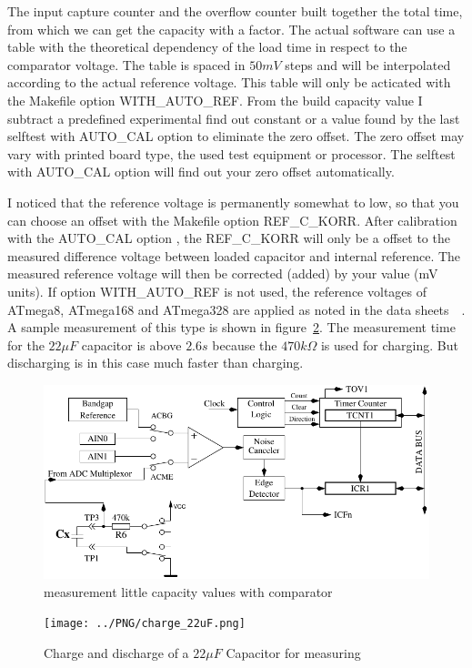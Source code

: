 The input capture counter and the overflow counter built together the total time,
from which we can get the capacity with a factor.
The actual software can use a table with the theoretical  dependency of the load time in respect to the comparator voltage.
The table is spaced in \(50mV\) steps and will be interpolated according to the actual reference voltage. 
This table will only be acticated with the Makefile option WITH\_AUTO\_REF.
From the build capacity value I subtract a predefined experimental find out constant or a value found by the last selftest
with AUTO\_CAL option to eliminate the zero offset. 
The zero offset may vary with printed board type, the used test equipment or processor.
The selftest with AUTO\_CAL option will find out your zero offset automatically.

I noticed that the reference voltage is permanently somewhat to low,
 so that you can choose an offset with the Makefile option REF\_C\_KORR.
After calibration with the AUTO\_CAL option , the REF\_C\_KORR will only be a offset to the measured difference voltage
between loaded capacitor and internal reference.
The measured reference voltage will then be corrected (added) by your value (mV units).
If option WITH\_AUTO\_REF is not used, the reference voltages of ATmega8, ATmega168 and ATmega328
are applied as noted in the data sheets~\cite{ATmega8}~\cite{ATmega168}. 
A sample measurement of this type is shown in figure~\ref{pic:c22uF}.
The measurement time for the \(22\mu F\) capacitor is above \(2.6s\) because the \(470k\Omega\) is
used for charging. But discharging is in this case much faster than charging.

\begin{figure}[H]
\centering
\includegraphics[width=.8\textwidth]{../FIG/Comparat.pdf}
\caption{measurement little capacity values with comparator}
\label{fig:comparat}
\end{figure}

\begin{figure}[H]
  \centering
    \texttt{[image: ../PNG/charge\_22uF.png]}
  \caption{Charge and discharge of a \(22\mu F\) Capacitor for measuring}
  \label{pic:c22uF}
\end{figure}


